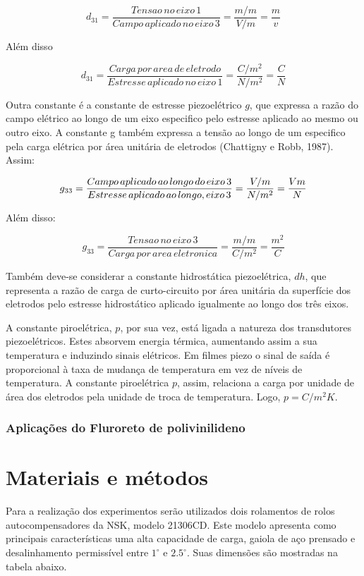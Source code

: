 \documentclass[
	12pt,				
	oneside,			
	a4paper,			
	english,			
	brazil				
	]{abntex2ppgsi}
\begin{document}
\[d_{31} = \frac{Tensao \,no \,eixo \,1}{Campo \,aplicado \,no \,eixo \,3} = \frac{m/m}{V/m} = \frac{m}{v} \]

Além disso

\[d_{31} = \frac{Carga \,por \,area \,de \,eletrodo}{Estresse \,aplicado \,no \,eixo \,1} = \frac{C/m^{2}}{N/m^{2}} = \frac{C}{N} \]

Outra constante é a constante de estresse piezoelétrico $g$, que expressa a razão do campo elétrico ao longo de um eixo especifico pelo estresse aplicado ao mesmo ou outro eixo. A constante g também expressa a tensão ao longo de um especifico pela carga elétrica por área unitária de eletrodos (Chattigny e Robb, 1987). Assim:

\[g_{33} = \frac{Campo \,aplicado \,ao \,longo \,do \,eixo \,3}{Estresse \,aplicado \,ao \,longo ,\do \,eixo \,3} = \frac{V/m}{N/m^{2}} = \frac{Vm}{N} \]

Além disso:

\[g_{33} = \frac{Tensao \,no \,eixo \,3}{Carga \,por \,area \,eletronica} = \frac{m/m}{C/m^{2}} = \frac{m^{2}}{C} \]

Também deve-se considerar a constante hidrostática piezoelétrica, $dh$, que representa a razão de carga de curto-circuito por área unitária da superfície dos eletrodos pelo estresse hidrostático aplicado igualmente ao longo dos três eixos. 

A constante piroelétrica, $p$, por sua vez, está ligada a natureza dos transdutores piezoelétricos. Estes absorvem energia térmica, aumentando assim a sua temperatura e induzindo sinais elétricos. Em filmes piezo o sinal de saída é proporcional à taxa de mudança de temperatura em vez de níveis de temperatura. A constante piroelétrica $p$, assim, relaciona a carga por unidade de área dos eletrodos pela unidade de troca de temperatura. Logo, $p = C/m^{2} K$.


\subsection{\textbf{Aplicações do Fluroreto de polivinilideno}}




\chapter{Materiais e métodos}

Para a realização dos experimentos serão utilizados dois rolamentos de rolos autocompensadores da NSK, modelo 21306CD. Este modelo apresenta como principais características uma alta capacidade de carga, gaiola de aço prensado e desalinhamento permissível entre $1^{\circ}$ e $2.5^{\circ}$. Suas dimensões são mostradas na tabela abaixo.  
\end{document}
